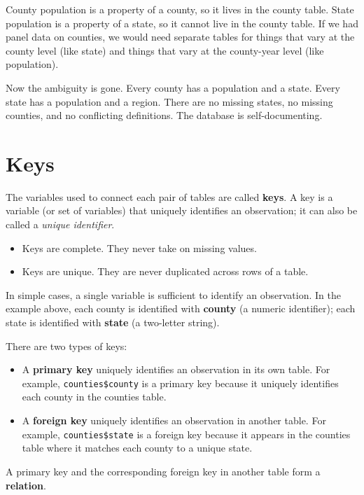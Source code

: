 \documentclass[
]{book}
\providecommand{\tightlist}{%
  \setlength{\itemsep}{0pt}\setlength{\parskip}{0pt}}
\begin{document}
County population is a property of a county, so it lives in the county table. State population is a property of a state, so it cannot live in the county table. If we had panel data on counties, we would need separate tables for things that vary at the county level (like state) and things that vary at the county-year level (like population).

Now the ambiguity is gone. Every county has a population and a state. Every state has a population and a region. There are no missing states, no missing counties, and no conflicting definitions. The database is self-documenting.

\hypertarget{keys}{%
\section{Keys}\label{keys}}

The variables used to connect each pair of tables are called \textbf{keys}. A key is a variable (or set of variables) that uniquely identifies an observation; it can also be called a \emph{unique identifier}.

\begin{itemize}
\tightlist
\item
  Keys are complete. They never take on missing values.
\item
  Keys are unique. They are never duplicated across rows of a table.
\end{itemize}

In simple cases, a single variable is sufficient to identify an observation. In the example above, each county is identified with \textbf{county} (a numeric identifier); each state is identified with \textbf{state} (a two-letter string).

There are two types of keys:

\begin{itemize}
\item
  A \textbf{primary key} uniquely identifies an observation in its own table. For example, \texttt{counties\$county} is a primary key because it uniquely identifies each county in the counties table.
\item
  A \textbf{foreign key} uniquely identifies an observation in another table. For example, \texttt{counties\$state} is a foreign key because it appears in the counties table where it matches each county to a unique state.
\end{itemize}

A primary key and the corresponding foreign key in another table form a \textbf{relation}.
\end{document}

